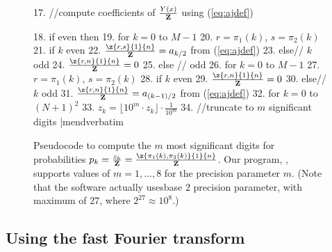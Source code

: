 \begin{figure}[!ht]
\begin{small}
17. //compute coefficients of $\frac{Y(x)}{{\bf Z}}$ using (\ref{eq:ajdef})


18. if \dBP{\strA}{\strB} even then
19.   for $k=0$ to $M-1$
20.     $r=\pi_1(k)$, $s=\pi_2(k)$
21.     if $k$ even
22.       $\frac{\z{r,s}{1}{n}}{{\bf Z}} = a_{k/2}$ from (\ref{eq:ajdef})
23.     else// $k$ odd
24.       $\frac{\z{r,n}{1}{n}}{{\bf Z}} = 0$
25. else // \dBP{\strA}{\strB} odd
26.   for $k=0$ to $M-1$
27.     $r=\pi_1(k)$, $s=\pi_2(k)$
28.     if $k$ even
29.       $\frac{\z{r,n}{1}{n}}{{\bf Z}} = 0$
30.     else// $k$ odd
31.       $\frac{\z{r,n}{1}{n}}{{\bf Z}} = a_{(k-1)/2}$ from (\ref{eq:ajdef})
32.  for $k=0$ to $(N+1)^2$
33.    $z_k = \lfloor 10^m \cdot z_k \rfloor \cdot \frac{1}{10^m}$
34.    //truncate to $m$ significant digits
|mendverbatim
\end{small}
\caption{\small
Pseudocode to compute the $m$ most significant digits
for probabilities
$p_k = \frac{z_{k}}{{\bf Z}}=\frac{\z{\pi_1(k),\pi_2(k)}{1}{n}}{{\bf Z}}$.
Our program, \ffttwo, supports values of $m = 1,\ldots,8$ for the
precision parameter $m$.
(Note that the software actually usesbase $2$ precision parameter, with maximum of $27$, where $2^{27} \approx
10^8$.)
}
\label{pseudocode:interpolatingP}
\end{figure}


\subsection{Using the fast Fourier transform}
\label{section:FFT}

